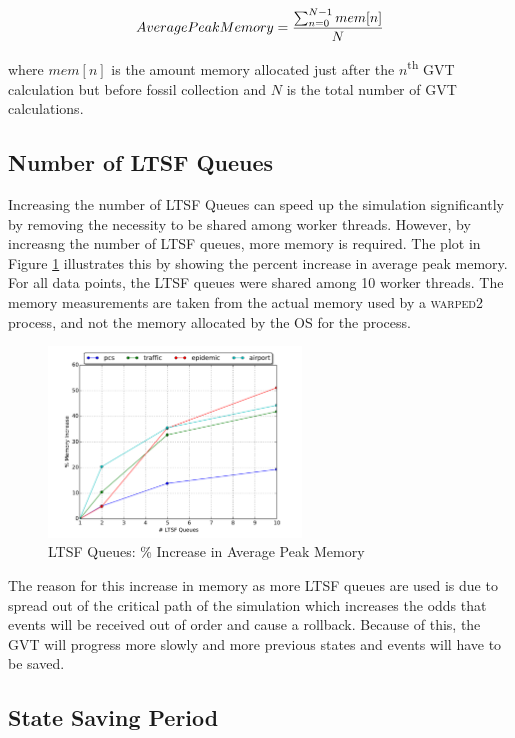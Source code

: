 \documentclass[11pt]{book}
\begin{document}
$$ Average Peak Memory = {\sum_{n=0}^{N-1} {mem[n]} \over N} $$

\noindent
where $mem[n]$ is the amount memory allocated just after the $n$\textsuperscript{th} GVT calculation
but before fossil collection and $N$ is the total number of GVT calculations.

\subsection{Number of LTSF Queues}

Increasing the number of LTSF Queues can speed up the simulation significantly by removing
the necessity to be shared among worker threads.  However, by increasng the number of LTSF queues,
more memory is required.  The plot in Figure \ref{ltsf_memory} illustrates this by showing the
percent increase in average peak memory.  For all data points, the LTSF queues were shared among
10 worker threads.  The memory measurements are taken from the actual memory used by a
\textsc{warped2} process, and not the memory allocated by the OS for the process.

\begin{figure}
  \centering
  \includegraphics[width=0.6\textwidth,keepaspectratio,quiet]{figs/pending_event_set/ltsf_memory_increase.pdf}
  \caption{LTSF Queues: \% Increase in Average Peak Memory}\label{ltsf_memory}
\end{figure}

The reason for this increase in memory as more LTSF queues are used is due to spread out of the
critical path of the simulation which increases the odds that events will be received out of
order and cause a rollback.  Because of this, the GVT will progress more slowly and more previous
states and events will have to be saved.  

\subsection{State Saving Period}
\end{document}
